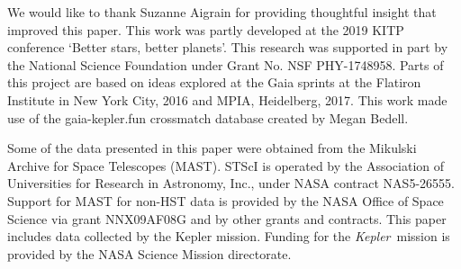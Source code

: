 \documentclass{aastex63}
\newcommand{\kepler}{{\it Kepler}}
\newcommand{\Kepler}{{\it Kepler}}
\newcommand{\vz}{$v_{\bf z}$}
\newcommand{\vb}{$v_{\bf b}$}
\newcommand{\sigmavb}{$\sigma_{v{\bf b}}$}
\begin{document}
\begin{itemize}

\end{itemize}

We would like to thank Suzanne Aigrain for providing thoughtful insight that
improved this paper.
This work was partly developed at the 2019 KITP conference `Better stars,
better planets'.
This research was supported in part by the National Science Foundation under
Grant No. NSF PHY-1748958.
Parts of this project are based on ideas explored at the Gaia sprints at the
Flatiron Institute in New York City, 2016 and MPIA, Heidelberg, 2017.
This work made use of the gaia-kepler.fun crossmatch database created by Megan
Bedell.

Some of the data presented in this paper were obtained from the Mikulski
Archive for Space Telescopes (MAST).
STScI is operated by the Association of Universities for Research in
Astronomy, Inc., under NASA contract NAS5-26555.
Support for MAST for non-HST data is provided by the NASA Office of Space
Science via grant NNX09AF08G and by other grants and contracts.
This paper includes data collected by the Kepler mission. Funding for the
\Kepler\ mission is provided by the NASA Science Mission directorate.
\end{document}
